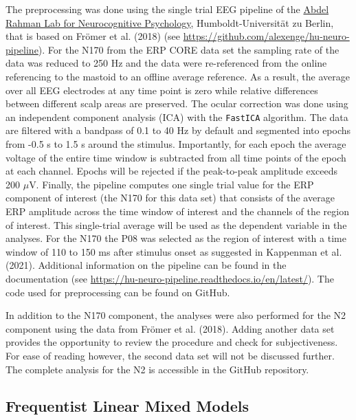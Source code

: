 \documentclass[
  doc,12pt,floatsintext]{apa7}
\begin{document}
The preprocessing was done using the single trial EEG pipeline of the \href{https://abdelrahmanlab.com/}{Abdel Rahman Lab for Neurocognitive Psychology}, Humboldt-Universität zu Berlin, that is based on Frömer et al. (2018) (see \url{https://github.com/alexenge/hu-neuro-pipeline}). For the N170 from the ERP CORE data set the sampling rate of the data was reduced to 250 Hz and the data were re-referenced from the online referencing to the mastoid to an offline average reference. As a result, the average over all EEG electrodes at any time point is zero while relative differences between different scalp areas are preserved. The ocular correction was done using an independent component analysis (ICA) with the \texttt{FastICA} algorithm. The data are filtered with a bandpass of 0.1 to 40 Hz by default and segmented into epochs from -0.5 s to 1.5 s around the stimulus. Importantly, for each epoch the average voltage of the entire time window is subtracted from all time points of the epoch at each channel. Epochs will be rejected if the peak-to-peak amplitude exceeds 200 \(\mu\)V. Finally, the pipeline computes one single trial value for the ERP component of interest (the N170 for this data set) that consists of the average ERP amplitude across the time window of interest and the channels of the region of interest. This single-trial average will be used as the dependent variable in the analyses. For the N170 the P08 was selected as the region of interest with a time window of 110 to 150 ms after stimulus onset as suggested in Kappenman et al. (2021). Additional information on the pipeline can be found in the documentation (see \url{https://hu-neuro-pipeline.readthedocs.io/en/latest/}). The code used for preprocessing can be found on GitHub.

In addition to the N170 component, the analyses were also performed for the N2 component using the data from Frömer et al. (2018). Adding another data set provides the opportunity to review the procedure and check for subjectiveness. For ease of reading however, the second data set will not be discussed further. The complete analysis for the N2 is accessible in the GitHub repository.

\subsection{Frequentist Linear Mixed Models}\label{frequentist-linear-mixed-models}
\end{document}
